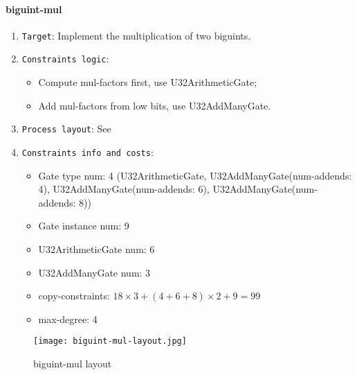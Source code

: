 \paragraph{biguint-mul}

\begin{enumerate}
    \item \verb|Target|: Implement the multiplication of two biguints.
    \item \verb|Constraints logic|:
    \begin{itemize}
        \item Compute mul-factors first, use U32ArithmeticGate;
        \item Add mul-factors from low bits, use U32AddManyGate.
    \end{itemize}
    \item \verb|Process layout|: See 
    \item \verb|Constraints info and costs|:
    \begin{itemize}
        \item Gate type num: 4 (U32ArithmeticGate, U32AddManyGate(num-addends: 4), U32AddManyGate(num-addends: 6), U32AddManyGate(num-addends: 8))
        \item Gate instance num: 9
        \item U32ArithmeticGate num: 6
        \item U32AddManyGate num: 3
        \item copy-constraints: $18 \times 3 + (4 + 6 + 8) \times 2 + 9 = 99$
        \item max-degree: 4
    \end{itemize}
\end{enumerate}

\begin{figure}[!ht]
    \centering
    \texttt{[image: biguint-mul-layout.jpg]}
    \caption{biguint-mul layout}
    \label{fig:biguint-mul-layout}
\end{figure}